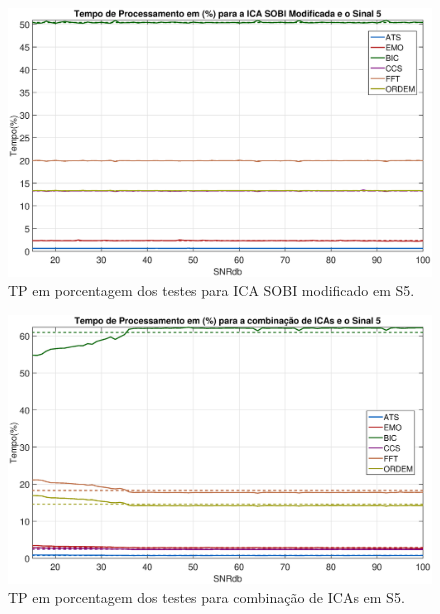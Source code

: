 \documentclass[a4paper,12pt]{monografia}
\theoremstyle{plain}
\theoremstyle{definition}
\theoremstyle{remark}
\begin{document}
\begin{figure}[!htb]
    \begin{center}
    \advance\leftskip -1.5cm
    \includegraphics[scale=0.45]{imagens/ImagensParaOAnexo/TPPRICASOBImodSinal5.eps}
    \caption{TP em porcentagem dos testes para ICA SOBI modificado em S5.}
    \label{fig:TPSMAS5}    
    \end{center}
\end{figure}

\begin{figure}[!htb]
    \begin{center}
    \advance\leftskip -1.5cm
    \includegraphics[scale=0.45]{imagens/ImagensParaOAnexo/TPPRCombinacaoICASinal5.eps}
    \caption{TP em porcentagem dos testes para combinação de ICAs em S5.}
    \label{fig:TPCIRS5}    
    \end{center}
\end{figure}
\end{document}
